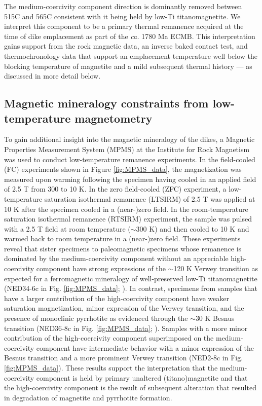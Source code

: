 \documentclass[draft]{agujournal2019}
\begin{document}
The medium-coercivity component direction is dominantly removed between 515\textdegree C and 565\textdegree C consistent with it being held by low-Ti titanomagnetite. We interpret this component to be a primary thermal remanence acquired at the time of dike emplacement as part of the \textit{ca.} 1780 Ma ECMB. This interpretation gains support from the rock magnetic data, an inverse baked contact test, and thermochronology data that support an emplacement temperature well below the blocking temperature of magnetite and a mild subsequent thermal history --- as discussed in more detail below. 

\subsection{Magnetic mineralogy constraints from low-temperature magnetometry}

To gain additional insight into the magnetic mineralogy of the dikes, a Magnetic Properties Measurement System (MPMS) at the Institute for Rock Magnetism was used to conduct low-temperature remanence experiments. In the field-cooled (FC) experiments shown in Figure \ref{fig:MPMS_data}, the magnetization was measured upon warming following the specimen having cooled in an applied field of 2.5 T from 300 to 10 K. In the zero field-cooled (ZFC) experiment, a low-temperature saturation isothermal remanence (LTSIRM) of 2.5 T was applied at 10 K after the specimen cooled in a (near-)zero field. In the room-temperature saturation isothermal remanence (RTSIRM) experiment, the sample was pulsed with a 2.5 T field at room temperature ($\sim$300 K) and then cooled to 10 K and warmed back to room temperature in a (near-)zero field. These experiments reveal that sister specimens to paleomagnetic specimens whose remanence is dominated by the medium-coercivity component without an appreciable high-coercivity component have strong expressions of the $\sim$120 K Verwey transition as expected for a ferromagnetic mineralogy of well-preserved low-Ti titanomagnetite (NED34-6c in Fig. \ref{fig:MPMS_data}; ). In contrast, specimens from samples that have a larger contribution of the high-coercivity component have weaker saturation magnetization, minor expression of the Verwey transition, and the presence of monoclinic pyrrhotite as evidenced through the $\sim$30 K Besnus transition (NED36-8c in Fig. \ref{fig:MPMS_data}; ). Samples with a more minor contribution of the high-coercivity component superimposed on the medium-coercivity component have intermediate behavior with a minor expression of the Besnus transition and a more prominent Verwey transition (NED2-8c in Fig. \ref{fig:MPMS_data}). These results support the interpretation that the medium-coercivity component is held by primary unaltered (titano)magnetite and that the high-coercivity component is the result of subsequent alteration that resulted in degradation of magnetite and pyrrhotite formation.
\end{document}
